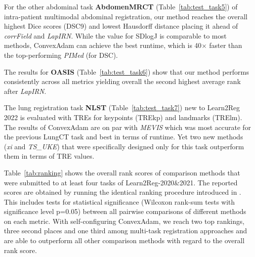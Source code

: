  For the other abdominal task \textbf{AbdomenMRCT} (Table~\ref{tab:test_task5}) of intra-patient multimodal abdominal registration, our method reaches the overall highest Dice scores (DSC9) and lowest Hausdorff distance placing it ahead of \textit{corrField} and \textit{LapIRN}. While the value for SDlogJ is comparable to most methods, ConvexAdam can achieve the best runtime, which is 40$\times$ faster than the top-performing \textit{PIMed} (for DSC).

The results for \textbf{OASIS} (Table~\ref{tab:test_task6}) show that our method performs consistently across all metrics yielding overall the second highest average rank after \textit{LapIRN}.%

The lung registration task \textbf{NLST} (Table~\ref{tab:test_task7}) new to Learn2Reg 2022 is evaluated with TREs for keypoints (TREkp) and landmarks (TRElm). The results of ConvexAdam are on par with \textit{MEVIS} which was most accurate for the previous LungCT task and best in terms of runtime. Yet two new methods (\textit{xi} and \textit{TS\_UKE}) that were specifically designed only for this task outperform them in terms of TRE values. %


Table~\ref{tab:ranking} shows the overall rank scores of comparison methods that were submitted to at least four tasks of Learn2Reg-2020\&2021. The reported scores are obtained by running the identical ranking procedure introduced in \citep{hering2022learn2reg}. This includes tests for statistical significance (Wilcoxon rank-sum tests with significance level p=0.05) between all pairwise comparisons of different methods on each metric. With self-configuring ConvexAdam, we reach two top rankings, three second places and one third among multi-task registration approaches and are able to outperform all other comparison methods with regard to the overall rank score.


